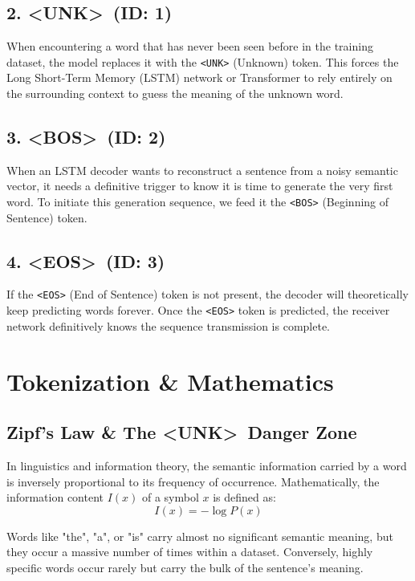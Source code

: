 \documentclass[10pt, conference]{IEEEtran}
\begin{document}
\subsection{\textbf{2. \textless UNK\textgreater \ (ID: 1)}}
When encountering a word that has never been seen before in the training dataset, the model replaces it with the \texttt{\textless UNK\textgreater} (Unknown) token. This forces the Long Short-Term Memory (LSTM) network or Transformer to rely entirely on the surrounding context to guess the meaning of the unknown word.

\subsection{\textbf{3. \textless BOS\textgreater \ (ID: 2)}}
When an LSTM decoder wants to reconstruct a sentence from a noisy semantic vector, it needs a definitive trigger to know it is time to generate the very first word. To initiate this generation sequence, we feed it the \texttt{\textless BOS\textgreater} (Beginning of Sentence) token.

\subsection{\textbf{4. \textless EOS\textgreater \ (ID: 3)}}
If the \texttt{\textless EOS\textgreater} (End of Sentence) token is not present, the decoder will theoretically keep predicting words forever. Once the \texttt{\textless EOS\textgreater} token is predicted, the receiver network definitively knows the sequence transmission is complete.


\section{\large \textbf{Tokenization \& Mathematics}}

\subsection{\textbf{Zipf's Law \& The \textless UNK\textgreater \ Danger Zone}}
In linguistics and information theory, the semantic information carried by a word is inversely proportional to its frequency of occurrence. Mathematically, the information content $I(x)$ of a symbol $x$ is defined as:
\begin{equation}
    I(x) = -\log P(x)
\end{equation}

Words like "the", "a", or "is" carry almost no significant semantic meaning, but they occur a massive number of times within a dataset. Conversely, highly specific words occur rarely but carry the bulk of the sentence's meaning.
\end{document}
